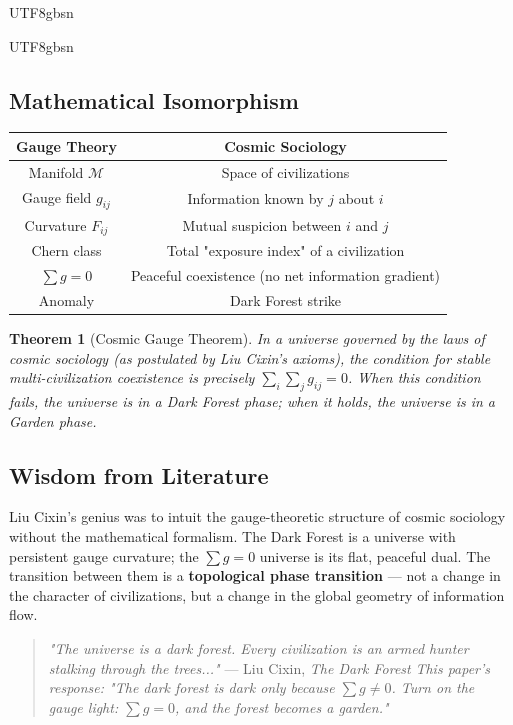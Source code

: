 \documentclass[11pt,a4paper]{article}
\newtheorem{theorem}{Theorem}[section]
\newcommand{\Manifold}{\mathcal{M}}
\begin{document}
\begin{CJK}{UTF8}{gbsn}
{\begin{CJK}{UTF8}{gbsn}
\subsection{Mathematical Isomorphism}
\begin{center}
\begin{tabular}{c|c}
    \textbf{Gauge Theory} & \textbf{Cosmic Sociology} \\
    \hline
    Manifold $\Manifold$ & Space of civilizations \\
    Gauge field $g_{ij}$ & Information known by $j$ about $i$ \\
    Curvature $F_{ij}$ & Mutual suspicion between $i$ and $j$ \\
    Chern class & Total "exposure index" of a civilization \\
    $\sum g = 0$ & Peaceful coexistence (no net information gradient) \\
    Anomaly & Dark Forest strike \\
\end{tabular}
\end{center}
\begin{theorem}[Cosmic Gauge Theorem]
In a universe governed by the laws of cosmic sociology (as postulated by Liu Cixin's
axioms), the condition for stable multi-civilization coexistence is precisely
$\sum_i \sum_j g_{ij} = 0$. When this condition fails, the universe is in a
\textit{Dark Forest phase}; when it holds, the universe is in a \textit{Garden phase}.
\end{theorem}
\subsection{Wisdom from Literature}
Liu Cixin's genius was to intuit the gauge-theoretic structure of cosmic sociology
without the mathematical formalism. The Dark Forest is a universe with persistent
gauge curvature; the $\sum g = 0$ universe is its flat, peaceful dual. The transition
between them is a \textbf{topological phase transition} --- not a change in the
character of civilizations, but a change in the global geometry of information flow.
\begin{quote}
    \textit{"The universe is a dark forest. Every civilization is an armed hunter
    stalking through the trees..."} --- Liu Cixin, \textit{The Dark Forest}
    \textit{This paper's response: "The dark forest is dark only because
    $\sum g \neq 0$. Turn on the gauge light: $\sum g = 0$, and the forest
    becomes a garden."}
\end{quote}
\end{CJK}
}
\end{CJK}
\end{document}

